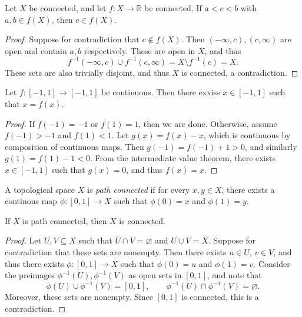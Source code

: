 \begin{theorem}\label{thm:4.7}
	Let $X$ be connected, and let $f : X \to \mathbb{R} $ be connected. If $a<c<b$ with $a,b\in f(X)$, then $c\in f(X)$.
\end{theorem}
\begin{proof}
	Suppose for contradiction that $c\notin f(X)$. Then $\left( -\infty ,c \right) ,\left( c,\infty  \right) $ are open and contain $a,b$ respectively. These are open in $X$, and thus
	\[
		f^{-1} \left( -\infty ,c \right) \cup f^{-1} \left( c,\infty  \right) =X\setminus f^{-1} (c)=X
	.\]
	These sets are also trivially disjoint, and thus $X$ is connected, a contradiction.
\end{proof}
\begin{theorem}\label{thm:4.8}
	Let $f : [-1,1] \to [-1,1]$ be continuous. Then there exxiss $x\in [-1,1]$ such that $x=f(x)$.
\end{theorem}
\begin{proof}
	If $f(-1)=-1$ or $f(1)=1$, then we are done. Otherwise, assume $f(-1)>-1$ and $f(1)<1$. Let $g(x)=f(x)-x$, which is continuous by composition of continuous maps. Then $g(-1)=f(-1)+1>0$, and similarly $g(1)=f(1)-1<0$. From the intermediate value theorem, there exists $x\in [-1,1]$ such that $g(x)=0$, and thus $f(x)=x$.
\end{proof}

\begin{definition}\label{dfn:4.3}
	A topological space $X$ is \emph{path connected} if for every $x,y\in X$, there exists a continous map $\phi :[0,1]\to X$ such that $\phi (0)=x$ and $\phi (1)=y$.
\end{definition}
\begin{lemma}\label{lma:4.2}
	If $X$ is path connected, then $X$ is connected.
\end{lemma}
\begin{proof}
	Let $U,V\subseteq X$ such that $U \cap V=\varnothing $ and $U \cup V=X$. Suppose for contradiction that these sets are nonempty. Then there exists $u\in U$, $v\in V$, and thus there exists $\phi : [0,1] \to X$ such that $\phi (0)=u$ and $\phi (1)=v$. Consider the preimages $\phi ^{-1} (U),\phi ^{-1} (V)$ as open sets in $[0,1]$, and note that
	\[
		\phi (U) \cup \phi ^{-1} (V)=[0,1],\qquad \phi ^{-1} (U) \cap \phi ^{-1} (V)=\varnothing 
	.\]
	Moreover, these sets are nonempty. Since $[0,1]$ is connected, this is a contradiction.
\end{proof}

